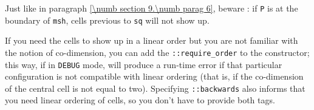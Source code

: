 Just like in paragraph \ref{\numb section 9.\numb parag 6}, beware : if {\small\tt P}
is at the boundary of {\small\tt msh}, cells previous to {\small\tt sq} will not
show up.

If you need the cells to show up in a linear order but you are not familiar
with the notion of co-dimension, you can add the {\small\tt{}::require\_order}
to the {\small\tt{}} constructor;
this way, if in {\small\tt DEBUG} mode, {\maniFEM} will produce a run-time error
if that particular configuration is not compatible with linear ordering
(that is, if the co-dimension of the central cell is not equal to two).
Specifying {\small\tt{}::backwards} also informs {\maniFEM} that you need
linear ordering of cells, so you don't have to provide both tags.
